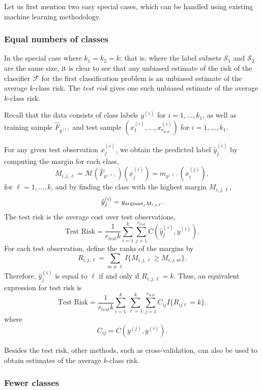 \documentclass[12pt]{article}
\begin{document}
Let us first mention two easy special cases, which can be handled
using existing machine learning methodology.

\subsubsection{Equal numbers of classes}

In the special case where $k_1 = k_2 = k$: that is, where the label
subsets $\mathcal{S}_1$ and $\mathcal{S}_2$ are the same size, it is
clear to see that any unbiased estimate of the risk of the classifier
$\mathcal{F}$ for the first classification problem is an unbiased
estimate of the average $k$-class risk.  The \emph{test risk}
gives one such unbiased estimate of the average $k$-class risk.

Recall that the data consists of class labels $y^{(i)}$ for $i =
1,\hdots, k_1$, as well as training sample $\hat{F}_{y^{(i)}}$ and
test sample $(x_1^{(i)},\hdots, x_{r_{test}}^{(i)})$ for $i =
1,\hdots, k_1$.

For any given test observation $x_j^{(i)}$, we obtain the predicted
label $\hat{y}_j^{(i)}$ by computing the margin for each class,
\[
M_{i,j,\ell} = \mathcal{M}(\hat{F}_{y^{(\ell)}})(x_j^{(i)}) =  m_{y^{(\ell)}}(x_i^{(j)}),
\]
for $\ell = 1,\hdots, k$,
and by finding the class with the highest margin $M_{i, j, \ell}$,
\[
\hat{y}_j^{(i)} = y_{\text{argmax}_\ell M_{i, j, \ell}}.
\]
The test risk is the average cost over test observations,
\begin{equation}
\text{Test Risk} = \frac{1}{r_{test}k} \sum_{i=1}^k \sum_{j=1}^{r_{test}} C(\hat{y}_j^{(i)}, y^{(i)}).
\end{equation}
For each test observation, define the ranks of the margins by
\[
R_{i,j,\ell} = \sum_{m \neq \ell} I\{M_{i,j,\ell} \geq M_{i, j, m}\}.
\]
Therefore, $\hat{y}_j^{(i)}$ is equal to $\ell$ if and only if $R_{i,j,\ell} = k$.
Thus, an equivalent expression for test risk is
\begin{equation}\label{eq:test_risk}
\text{Test Risk} = \frac{1}{r_{test}k} \sum_{i=1}^k \sum_{\ell=1}^k \sum_{j=1}^{r_{test}} C_{ij} I\{R_{ij\ell} = k\}.
\end{equation}
where
\[
C_{ij} = C(y^{(j)}, y^{(i)}).
\]

Besides the test risk, other methods, such as cross-validation, can
also be used to obtain estimates of the average $k$-class risk.

\subsubsection{Fewer classes}
\end{document}
